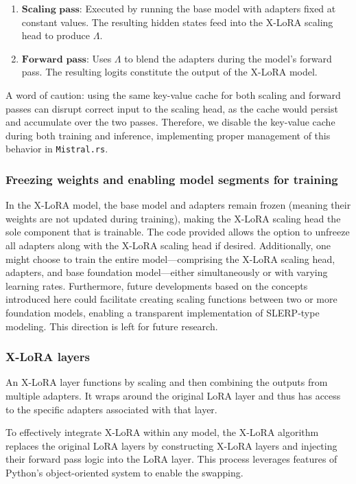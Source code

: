 \begin{enumerate}
    \item $\mathbf{Scaling}$ $\mathbf{pass}$: Executed by running the base model with adapters fixed at constant values. The resulting hidden states feed into the X-LoRA scaling head to produce $\Lambda$.
    \item $\mathbf{Forward}$ $\mathbf{pass}$: Uses $\Lambda$ to blend the adapters during the model's forward pass. The resulting logits constitute the output of the X-LoRA model.
\end{enumerate}

A word of caution: using the same key-value cache for both scaling and forward passes can disrupt correct input to the scaling head, as the cache would persist and accumulate over the two passes. Therefore, we disable the key-value cache during both training and inference, implementing proper management of this behavior in \texttt{Mistral.rs}.

\subsubsection{Freezing weights and enabling model segments for training} In the X-LoRA model, the base model and adapters remain frozen (meaning their weights are not updated during training), making the X-LoRA scaling head the sole component that is trainable. The code provided allows the option to unfreeze all adapters along with the X-LoRA scaling head if desired. Additionally, one might choose to train the entire model—comprising the X-LoRA scaling head, adapters, and base foundation model—either simultaneously or with varying learning rates. Furthermore, future developments based on the concepts introduced here could facilitate creating scaling functions between two or more foundation models, enabling a transparent implementation of SLERP-type modeling. This direction is left for future research.

\subsubsection{X-LoRA layers} An X-LoRA layer functions by scaling and then combining the outputs from multiple adapters. It wraps around the original LoRA layer and thus has access to the specific adapters associated with that layer.

To effectively integrate X-LoRA within any model, the X-LoRA algorithm replaces the original LoRA layers by constructing X-LoRA layers and injecting their forward pass logic into the LoRA layer. This process leverages features of Python’s object-oriented system to enable the swapping.

